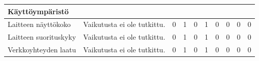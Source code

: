 \documentclass[finnish, 12pt, a4paper, elec, utf8, a-1b]{aaltothesis}
\begin{document}
{\begin{longtable}{p{2.5cm}|p{6cm}|p{0.5cm}p{0.5cm}p{0.5cm}|p{0.5cm}|p{0.5cm}p{0.5cm}p{0.5cm}|p{0.5cm}|}
    \midrule
    \textbf{Käyttöympäristö}                                                                                                                                                                                                                                                                                                                                                                                                                                                                                                                                                                                                                                                                          \\
    \midrule
    Laitteen näyttökoko                    & Vaikutusta ei ole tutkittu.                                                                                                                                                                                                                                                                                          & 0                                          & 1                                   & 0                                      & 1                            & 0                                               & 0                                         & 0                                         & 0                            \\
    \midrule
    Laitteen suorituskyky                  & Vaikutusta ei ole tutkittu.                                                                                                                                                                                                                                                                                          & 0                                          & 1                                   & 0                                      & 1                            & 0                                               & 0                                         & 0                                         & 0                            \\
    \midrule
    Verkkoyhteyden laatu                   & Vaikutusta ei ole tutkittu.                                                                                                                                                                                                                                                                                          & 0                                          & 1                                   & 0                                      & 1                            & 0                                               & 0                                         & 0                                         & 0                            \\

\end{longtable}}
\end{document}

